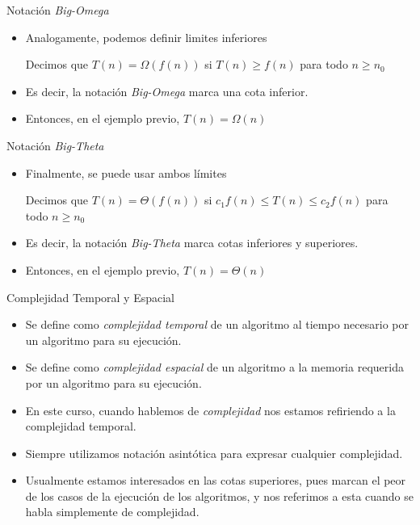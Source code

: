 \documentclass[handout]{beamer}
\begin{document}
\begin{frame}{Notaci\'on \textit{Big-Omega}}
\begin{itemize}
  \item Analogamente, podemos definir limites inferiores
\pause
\begin{definition}
Decimos que $T(n)=\Omega(f(n))$ si $T(n)\geq f(n)$ para todo $n\geq n_0$
\end{definition}
\pause
  \item Es decir, la notaci\'on \textit{Big-Omega} marca una cota inferior.
\pause
  \item Entonces, en el ejemplo previo, $T(n)=\Omega(n)$
\end{itemize}
\end{frame}

\begin{frame}{Notaci\'on \textit{Big-Theta}}
\begin{itemize}
  \item Finalmente, se puede usar ambos l\'imites
\pause
\begin{definition}
Decimos que $T(n)=\Theta(f(n))$ si $c_1 f(n) \leq T(n) \leq c_2 f(n)$ para todo $n\geq n_0$
\end{definition}
\pause
  \item Es decir, la notaci\'on \textit{Big-Theta} marca cotas inferiores y superiores.
\pause
  \item Entonces, en el ejemplo previo, $T(n)=\Theta(n)$
\end{itemize}
\end{frame}

\begin{frame}{Complejidad Temporal y Espacial}
\begin{itemize}
  \item Se define como \textit{complejidad temporal} de un algoritmo al tiempo
    necesario por un algoritmo para su ejecuci\'on.
\pause
  \item Se define como \textit{complejidad espacial} de un algoritmo a la
    memoria requerida por un algoritmo para su ejecuci\'on.
\pause
  \item En este curso, cuando hablemos de \textit{complejidad} nos estamos
    refiriendo a la complejidad temporal.
\pause
  \item Siempre utilizamos notaci\'on asint\'otica para expresar cualquier
    complejidad.
\pause
  \item Usualmente estamos interesados en las cotas superiores, pues marcan el
    peor de los casos de la ejecuci\'on de los algoritmos, y nos referimos a
    esta cuando se habla simplemente de complejidad.
\end{itemize}
\end{frame}
\end{document}
